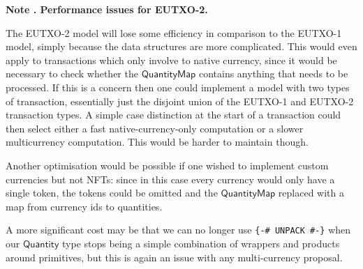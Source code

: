 \documentclass[a4paper]{article}
\newcounter{note}
\newcommand{\note}[1]{
  \bigskip
  \refstepcounter{note}
  \noindent\textbf{Note \thenote. #1}
}
\newcommand{\s}{\textsf}  %
\newcommand{\qty}{\ensuremath{\s{Quantity}}}
\newcommand{\qtymap}{\ensuremath{\s{QuantityMap}}}
\begin{document}
\note{Performance issues for EUTXO-2.}
\label{note:eutxo-2-performance}
The EUTXO-2 model will lose some efficiency in comparison to the EUTXO-1
model, simply because the data structures are more complicated.  This
would even apply to transactions which only involve to native
currency, since it would be necessary to check whether the \qtymap{}
contains anything that needs to be processed.  If this is a concern
then one could implement a model with two types of transaction,
essentially just the disjoint union of the EUTXO-1 and EUTXO-2
transaction types. A simple case distinction at the start of a
transaction could then select either a fast native-currency-only
computation or a slower multicurrency computation.  This would be
harder to maintain though.

\smallskip  Another optimisation would be possible if one wished to
implement custom currencies but not NFTs: since in this case every
currency would only have a single token, the tokens could be omitted
and the \qtymap{} replaced with a map from currency ids to quantities.

\smallskip A more significant cost may be that we can no longer use
\verb|{-# UNPACK #-}| when our \qty{} type stops being a simple
combination of wrappers and products around primitives, but this is
again an issue with any multi-currency proposal.


\end{document}
